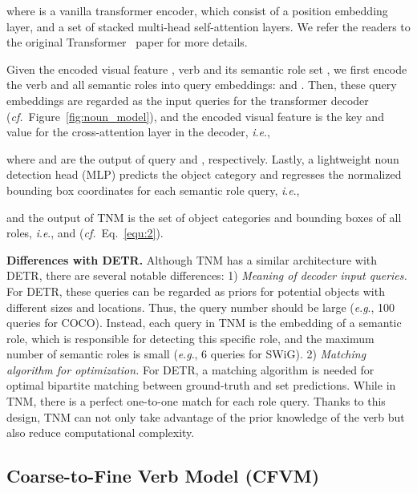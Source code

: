 \documentclass[letterpaper]{article} \usepackage{aaai22}  \usepackage{times}  \usepackage{helvet}  \usepackage{courier}  \usepackage[hyphens]{url}  \usepackage{graphicx} \urlstyle{rm} \def\UrlFont{\rm}  \usepackage{natbib}  \usepackage{caption} \DeclareCaptionStyle{ruled}{labelfont=normalfont,labelsep=colon,strut=off} \frenchspacing  \setlength{\pdfpagewidth}{8.5in}  \setlength{\pdfpageheight}{11in}
\newcommand{\ie}{\textit{i}.\textit{e}.}
\newcommand{\eg}{\textit{e}.\textit{g}.}
\newcommand{\cf}{\textit{cf.}}
\begin{document}
where  is a vanilla transformer encoder, which consist of a position embedding layer, and a set of stacked multi-head self-attention layers. We refer the readers to the original Transformer~\cite{vaswani2017attention} paper for more details.



Given the encoded visual feature , verb  and its semantic role set , we first encode the verb  and all semantic roles  into query embeddings:  and . Then, these query embeddings are regarded as the input queries for the transformer decoder (\cf~Figure~\ref{fig:noun_model}), and the encoded visual feature  is the key and value for the cross-attention layer in the decoder, \ie, 

where  and  are the output of query  and , respectively. Lastly, a lightweight noun detection head (MLP) predicts the object category and regresses the normalized bounding box coordinates for each semantic role query, \ie, 

and the output of TNM is the set of object categories and bounding boxes of all roles, \ie,  and  (\cf~Eq.~\eqref{equ:2}).











\noindent\textbf{Differences with DETR.} Although TNM has a similar architecture with DETR, there are several notable differences: 1) \emph{Meaning of decoder input queries.} For DETR, these queries can be regarded as priors for potential objects with different sizes and locations. Thus, the query number should be large (\eg, 100 queries for COCO). Instead, each query in TNM is the embedding of a semantic role, which is responsible for detecting this specific role, and the maximum number of semantic roles is small (\eg, 6 queries for SWiG). 2) \emph{Matching algorithm for optimization.} For DETR, a matching algorithm is needed for optimal bipartite matching between ground-truth and set predictions. While in TNM, there is a perfect one-to-one match for each role query. Thanks to this design, TNM can not only take advantage of the prior knowledge of the verb but also reduce computational complexity.







 
\subsection{Coarse-to-Fine Verb Model (CFVM)}
\end{document}
